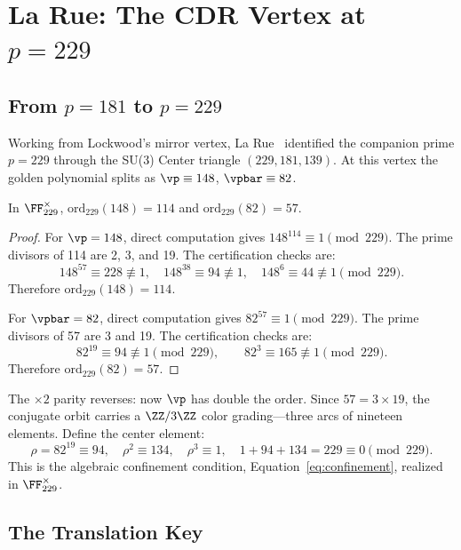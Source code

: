 \section{La Rue: The CDR Vertex at $p = 229$}

\subsection{From $p = 181$ to $p = 229$}

Working from Lockwood's mirror vertex, La Rue~\cite{larue_chromatic,larue_lc} identified the companion prime $p = 229$ through the SU(3) Center triangle $(229, 181, 139)$. At this vertex the golden polynomial splits as $\vp \equiv 148$, $\vpbar \equiv 82$.

\begin{theorem}[La Rue order theorem at $p = 229$]\label{thm:larue_order}
In $\FF_{229}^\times$, $\mathrm{ord}_{229}(148) = 114$ and $\mathrm{ord}_{229}(82) = 57$.
\end{theorem}

\begin{proof}
For $\vp = 148$, direct computation gives $148^{114} \equiv 1 \pmod{229}$. The prime divisors of 114 are 2, 3, and 19. The certification checks are:
\[
148^{57} \equiv 228 \not\equiv 1, \quad 148^{38} \equiv 94 \not\equiv 1, \quad 148^{6} \equiv 44 \not\equiv 1 \pmod{229}.
\]
Therefore $\mathrm{ord}_{229}(148) = 114$.

For $\vpbar = 82$, direct computation gives $82^{57} \equiv 1 \pmod{229}$. The prime divisors of 57 are 3 and 19. The certification checks are:
\[
82^{19} \equiv 94 \not\equiv 1 \pmod{229}, \qquad 82^{3} \equiv 165 \not\equiv 1 \pmod{229}.
\]
Therefore $\mathrm{ord}_{229}(82) = 57$. \qedhere
\end{proof}

The $\times 2$ parity reverses: now $\vp$ has double the order. Since $57 = 3 \times 19$, the conjugate orbit carries a $\ZZ/3\ZZ$ color grading---three arcs of nineteen elements. Define the center element:
\[
\rho = 82^{19} \equiv 94, \quad \rho^2 \equiv 134, \quad \rho^3 \equiv 1, \quad 1 + 94 + 134 = 229 \equiv 0 \pmod{229}.
\]
This is the algebraic confinement condition, Equation~\eqref{eq:confinement}, realized in $\FF_{229}^\times$.

\subsection{The Translation Key}

